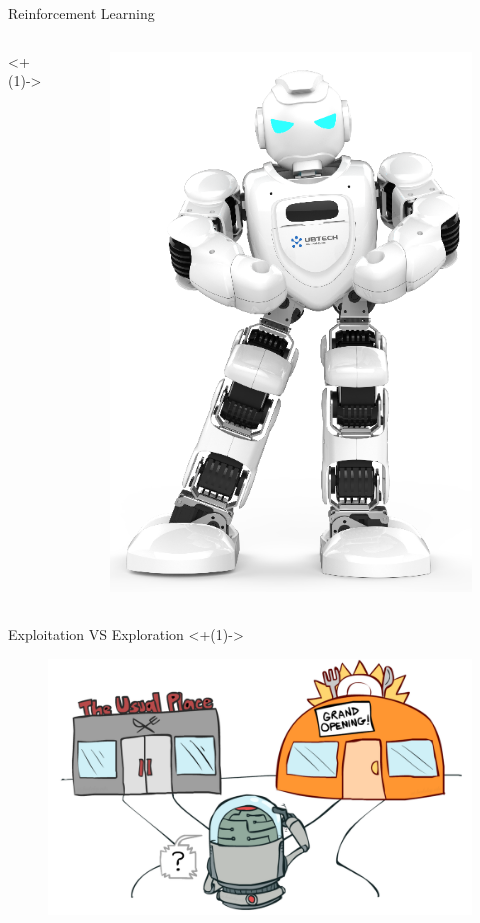 \begin{frame}{Reinforcement Learning}
\begin{columns}
	\onslide<+(1)->
	\begin{column}{0.35\textwidth}
	\begin{figure}
		\centering
		\includegraphics[width=0.7\linewidth]{Images/robotics}
	\end{figure}
	\end{column}
\end{columns}
\end{frame}

\begin{frame}{Exploitation VS Exploration}
	\onslide<+(1)->
	\begin{figure}
		\centering
		\includegraphics[width=0.7\linewidth]{Images/exp_exp}
	\end{figure}
\end{frame}





